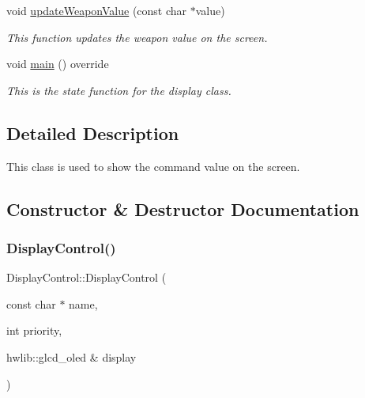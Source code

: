 \begin{DoxyCompactItemize}
\mbox{\label{class_display_control_ae343066ad92148ddc6cd9f253993d4b4}} 
void \mbox{\hyperlink{class_display_control_ae343066ad92148ddc6cd9f253993d4b4}{update\+Weapon\+Value}} (const char $\ast$value)
\begin{DoxyCompactList}\small\item\em This function updates the weapon value on the screen. \end{DoxyCompactList}\item 
void \mbox{\hyperlink{class_display_control_a9707c32249e0a648afc2def818900f30}{main}} () override
\begin{DoxyCompactList}\small\item\em This is the state function for the display class. \end{DoxyCompactList}\end{DoxyCompactItemize}


\subsection{Detailed Description}
This class is used to show the command value on the screen. 

\subsection{Constructor \& Destructor Documentation}
\mbox{\label{class_display_control_a5a24ccc28d6984bda6871ef6d0e4af3f}} 
\subsubsection{\texorpdfstring{Display\+Control()}{DisplayControl()}\hspace{0.1cm}{\footnotesize\ttfamily [1/2]}}
{\footnotesize\ttfamily Display\+Control\+::\+Display\+Control (\begin{DoxyParamCaption}\item[{const char $\ast$}]{name,  }\item[{int}]{priority,  }\item[{hwlib\+::glcd\+\_\+oled \&}]{display }\end{DoxyParamCaption})\hspace{0.3cm}{\ttfamily [inline]}}



